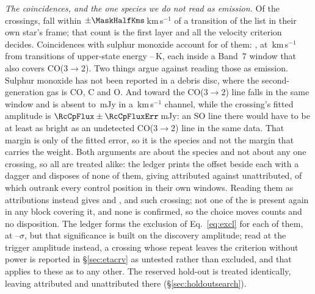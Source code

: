 \begin{table}
\centering
\footnotesize
\caption{The line mask, by species: the number of transitions $N$ it holds,
the frequency range they span inside the searched intervals and their
upper-state energies. Hydrogen recombination lines carry no tabulated
$E_{\rm u}$.}
\label{tab:masklines}

\end{table}

\emph{The coincidences, and the one species we do not read as emission.} Of
the \NCross{} crossings, \MkNCoinc{} fall within
$\pm\MaskHalfKms$\,km\,s$^{-1}$ of a transition of the list in their own
star's frame; that count is the first layer and all the velocity criterion
decides. Coincidences with sulphur monoxide account for \MkNSODecide{} of them:
\MkSOStars, at \MkSODvList\,km\,s$^{-1}$ from transitions of upper-state
energy \MkSOEuLo--\MkSOEuHi\,K, each inside a Band~7 window that also covers
CO($3\to2$). Two things argue against reading those as emission.
Sulphur monoxide has not been reported in a debris disc, where the
second-generation gas is CO, C and O. And toward \FrCpStar{} the CO($3\to2$)
line falls in the same window and is absent to \FrCpCoLimMJy\,mJy in a
\FrCpCoChanKms\,km\,s$^{-1}$ channel, while the crossing's fitted amplitude is
$\RcCpFlux\pm\RcCpFluxErr$\,mJy: an SO line there would have to be at
least as bright as an undetected CO($3\to2$) line in the same data. That
margin is only \RqAmpSigmaCp{} of the fitted error, so it is the species and
not the margin that carries the weight. Both arguments are about the species
and
not about any one crossing, so all \MkNSODecide{} are treated alike:
the ledger prints the offset beside each with a dagger and
disposes of none of them, giving \MkAttr{} attributed against \MkUnattr{}
unattributed, of which \MkRankLeadWord{} outrank every control position in
their own windows.
Reading them as attributions instead gives \MkAttrAlt{} and \MkUnattrAlt,
and \MkRankLeadAlt{} such crossing; not one of the \MkNSODecide{} is present
again in any block covering it, and none is confirmed, so the choice moves
counts and no disposition. The ledger forms the exclusion of
Eq.~\ref{eq:excl} for each of them, at
\MkAttrExclLo--\MkAttrExclHi$\sigma$, but that significance is built on the
discovery amplitude; read at the trigger amplitude instead, a crossing whose
repeat leaves the criterion without power is reported in
\S\ref{sec:etacrv} as untested rather than excluded, and that applies to
these as to any other. The reserved hold-out is treated identically, leaving
\HoNAttr{}
attributed and \HoNUnattr{} unattributed there (\S\ref{sec:holdoutsearch}).

